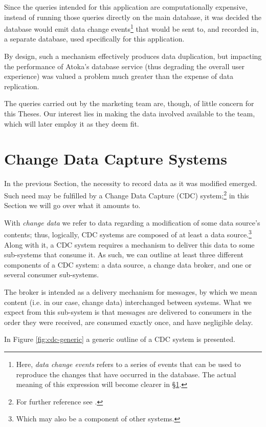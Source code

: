 Since the queries intended for this application are computationally expensive, instead of running those queries directly on the main database, it was decided the database would emit data change events\footnote{%
Here, \emph{data change events} refers to a series of events that can be used to reproduce the changes that have occurred in the database.
The actual meaning of this expression will become clearer in \S \ref{sec:cdc}.
} that would be sent to, and recorded in, a separate database, used specifically for this application.

By design, such a mechanism effectively produces data duplication, but impacting the performance of Atoka's database service (thus degrading the overall user experience) was valued a problem much greater than the expense of data replication.

The queries carried out by the marketing team are, though, of little concern for this Theses.
Our interest lies in making the data involved available to the team, which will later employ it as they deem fit.


\section{Change Data Capture Systems}
\label{sec:cdc}

In the previous Section, the necessity to record data as it was modified emerged.
Such need may be fulfilled by a Change Data Capture (CDC) system;\footnote{%
For further reference see \cite{cdc}.
} in this Section we will go over what it amounts to.

With \emph{change data} we refer to data regarding a modification of some data source's contents; thus, logically, CDC systems are composed of at least a data source.\footnote{%
Which may also be a component of other systems.}
Along with it, a CDC system requires a mechanism to deliver this data to some sub-systems that consume it.
As such, we can outline at least three different components of a CDC system: a data source, a change data broker, and one or several consumer sub-systems.

The broker is intended as a delivery mechanism for messages, by which we mean content (i.e. in our case, change data) interchanged between systems.
What we expect from this sub-system is that messages are delivered to consumers in the order they were received, are consumed exactly once, and have negligible delay.

In Figure \ref{fig:cdc-generic} a generic outline of a CDC system is presented.


